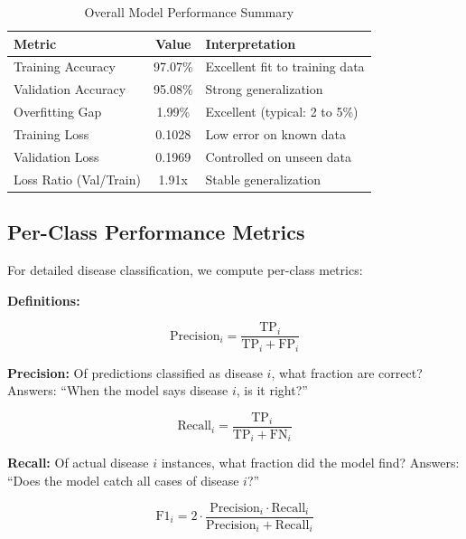 \documentclass[11pt,a4paper]{article}
\begin{document}
\begin{table}[H]
\centering
\caption{Overall Model Performance Summary}
\label{tab:overall_metrics}
\begin{tabularx}{\textwidth}{l c >{\raggedright\arraybackslash}X}
\toprule
\rowcolor{primarynavy}
\color{white}\textbf{Metric} & \color{white}\textbf{Value} & \color{white}\textbf{Interpretation} \\
\midrule
Training Accuracy & 97.07\% & Excellent fit to training data \\
\rowcolor{iceblue}
Validation Accuracy & 95.08\% & Strong generalization \\
Overfitting Gap & 1.99\% & Excellent (typical: 2 to 5\%) \\
\rowcolor{iceblue}
Training Loss & 0.1028 & Low error on known data \\
Validation Loss & 0.1969 & Controlled on unseen data \\
\rowcolor{iceblue}
Loss Ratio (Val/Train) & 1.91x & Stable generalization \\
\bottomrule
\end{tabularx}
\end{table}

\subsection{Per-Class Performance Metrics}

For detailed disease classification, we compute per-class metrics:

\textbf{Definitions:}

\begin{equation}
\text{Precision}_i = \frac{\text{TP}_i}{\text{TP}_i + \text{FP}_i}
\end{equation}

\textbf{Precision:} Of predictions classified as disease $i$, what fraction are correct? Answers: ``When the model says disease $i$, is it right?''

\begin{equation}
\text{Recall}_i = \frac{\text{TP}_i}{\text{TP}_i + \text{FN}_i}
\end{equation}

\textbf{Recall:} Of actual disease $i$ instances, what fraction did the model find? Answers: ``Does the model catch all cases of disease $i$?''

\begin{equation}
\text{F1}_i = 2 \cdot \frac{\text{Precision}_i \cdot \text{Recall}_i}{\text{Precision}_i + \text{Recall}_i}
\end{equation}
\end{document}
